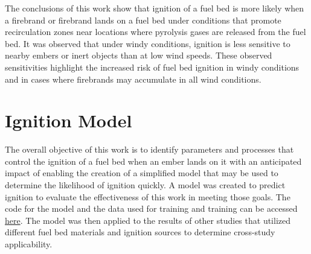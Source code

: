     The conclusions of this work show that ignition of a fuel bed is more likely when a firebrand or firebrand lands on a fuel bed under conditions that promote recirculation zones near locations where pyrolysis gases are released from the fuel bed. It was observed that under windy conditions, ignition is less sensitive to nearby embers or inert objects than at low wind speeds. These observed sensitivities highlight the increased risk of fuel bed ignition in windy conditions and in cases where firebrands may accumulate in all wind conditions. 

\section{Ignition Model}
    The overall objective of this work is to identify parameters and processes that control the ignition of a fuel bed when an ember lands on it with an anticipated impact of enabling the creation of a simplified model that may be used to determine the likelihood of ignition quickly. A model was created to predict ignition to evaluate the effectiveness of this work in meeting those goals. The code for the model and the data used for training and training can be accessed \href{https://github.com/derekb63/ignitionModel.git}{here}. The model was then applied to the results of other studies that utilized different fuel bed materials and ignition sources to determine cross-study applicability.
    
